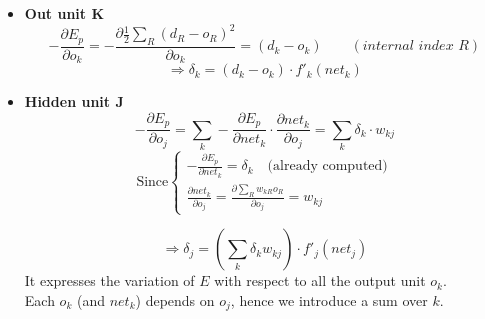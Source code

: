 \documentclass[../main.tex]{subfiles}
\begin{document}
\begin{itemize}
    \item \textbf{Out unit K}
    $$- \frac{\partial E_p}{\partial o_k} = - \frac{\partial \frac{1}{2} \sum_{R}(d_R-o_R)^2}{\partial o_k} = (d_k-o_k) \qquad (internal\,\, index\,\, R)$$ $$\Rightarrow \delta_k = (d_k-o_k) \cdot f'_k(net_k)$$
    \item \textbf{Hidden unit J}
    $$- \frac{\partial E_p}{\partial o_j} = \sum_{k} - \frac{\partial E_p}{\partial net_k}\cdot \frac{\partial net_k}{\partial o_j} = \sum_{k} \delta_k \cdot w_{kj}$$ 
    \[
    \text{Since}\left\{
        \begin{array}{ll}
            - \frac{\partial E_p}{\partial net_k} = \delta_k \quad \text{(already computed)}\\
            \frac{\partial net_k}{\partial o_j} = \frac{\partial \sum_{R}^{}w_{kR}o_R}{\partial o_j} = w_{kj}
        \end{array}
    \right.
\]
    
    $$\Rightarrow \delta_j = (\sum_{k}\delta_k w_{kj}) \cdot f'_j(net_j)$$
    It expresses the variation of $E$ with respect to all the output unit $o_k$.\\
    Each $o_k$ (and $net_k$) depends on $o_j$, hence we introduce a sum over $k$.\\
\end{itemize}
\end{document}
